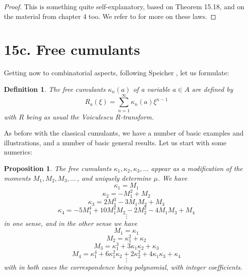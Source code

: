 \documentclass[12pt]{amsbook}
\newtheorem{definition}[theorem]{Definition}
\newtheorem{proposition}[theorem]{Proposition}
\begin{document}
\begin{proof}
This is something quite self-explanatory, based on Theorem 15.18, and on the material from chapter 4 too. We refer to \cite{bb+} for more on these laws. 
\end{proof}

\section*{15c. Free cumulants}

Getting now to combinatorial aspects, following Speicher \cite{nsp}, let us formulate:


\begin{definition}
The free cumulants $\kappa_n(a)$ of a variable $a\in A$ are defined by
$$R_a(\xi)=\sum_{n=1}^\infty\kappa_n(a)\xi^{n-1}$$
with $R$ being as usual the Voiculescu $R$-transform.
\end{definition}

As before with the classical cumulants, we have a number of basic examples and illustrations, and a number of basic general results. Let us start with some numerics:

\begin{proposition}
The free cumulants $\kappa_1,\kappa_2,\kappa_3,\ldots$ appear as a modification of the moments $M_1,M_2,M_3,\ldots\,$, and uniquely determine $\mu$. We have
$$\kappa_1=M_1$$
$$\kappa_2=-M_1^2+M_2$$
$$\kappa_3=2M_1^3-3M_1M_2+M_3$$
$$\kappa_4=-5M_1^4+10M_1^2M_2-2M_2^2-4M_1M_3+M_4$$
$$\vdots$$
in one sense, and in the other sense we have
$$M_1=\kappa_1$$
$$M_2=\kappa_1^2+\kappa_2$$
$$M_3=\kappa_1^3+3\kappa_1\kappa_2+\kappa_3$$
$$M_4=\kappa_1^4+6\kappa_1^2\kappa_2+2\kappa_2^2+4\kappa_1\kappa_3+\kappa_4$$
$$\vdots$$
with in both cases the correspondence being polynomial, with integer coefficients.
\end{proposition}
\end{document}
